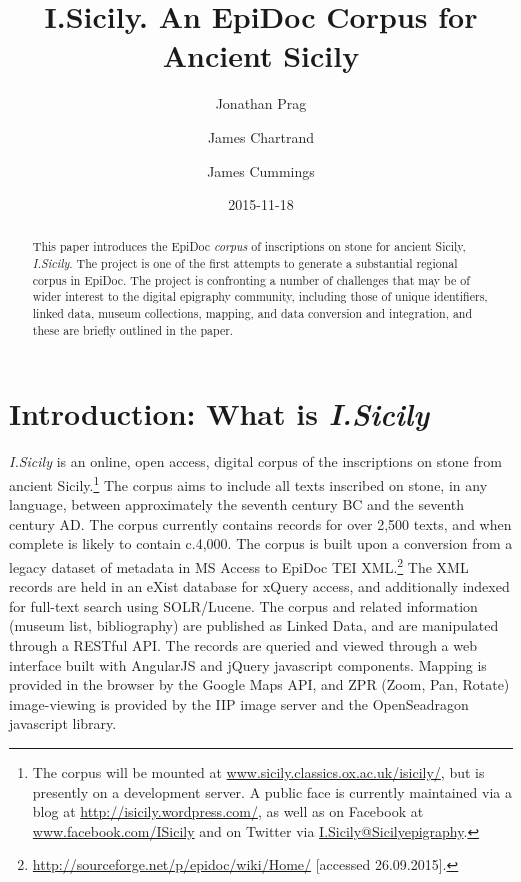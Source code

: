 \documentclass[amsthm,ebook]{saparticle}
\title{I.Sicily. An EpiDoc Corpus for Ancient Sicily}
\author[OXF]{Jonathan Prag\corref{first}}
\author[opensky]{James Chartrand}
\author[OXF]{James Cummings}
\date{2015-11-18}
\begin{document}
\maketitle
\begin{abstract}
This paper introduces the EpiDoc \emph{corpus} of inscriptions on stone for ancient Sicily, \emph{I.Sicily}. The project is one of the
first attempts to generate a substantial regional corpus in EpiDoc. The project is confronting a number of challenges
that may be of wider interest to the digital epigraphy community, including those of unique identifiers, linked data,
museum collections, mapping, and data conversion and integration, and these are briefly outlined in the paper.
\end{abstract}




\section{Introduction: What is \emph{I.Sicily}}
\noindent \emph{I.Sicily} is an online, open access, digital corpus of the inscriptions on stone from ancient Sicily.\footnote{ The
corpus will be mounted at \url{www.sicily.classics.ox.ac.uk/isicily/}, but is presently on a development server. A public face is
currently maintained via a blog at \url{http://isicily.wordpress.com/}, as well as on Facebook at \url{www.facebook.com/ISicily}
and on Twitter via \url{I.Sicily@Sicilyepigraphy}.} The corpus aims to include all texts inscribed on stone, in any language,
between approximately the seventh century BC and the seventh century AD. The corpus currently contains records for over
2,500 texts, and when complete is likely to contain c.4,000. The corpus is built upon a conversion from a legacy
dataset of metadata in MS Access to EpiDoc TEI XML.\footnote{\url{http://sourceforge.net/p/epidoc/wiki/Home/} [accessed
26.09.2015].} The XML records are held in an eXist database for xQuery access, and additionally indexed for full-text
search using SOLR/Lucene. The corpus and related information (museum list, bibliography) are published as Linked Data,
and are manipulated through a RESTful API. The records are queried and viewed through a web interface built with
AngularJS and jQuery javascript components. Mapping is provided in the browser by the Google Maps API, and ZPR (Zoom,
Pan, Rotate) image-viewing is provided by the IIP image server and the OpenSeadragon javascript library.
\end{document}
